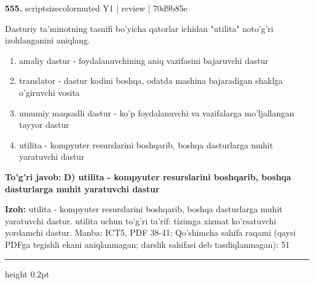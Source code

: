 \documentclass[10pt,a4paper]{article}
\begin{document}
{\bfseries\sffamily\color{ink} 555.} {scriptsizecolor{muted} Y1 | review | 70d9b85e}
\par
Dasturiy ta'minotning tasnifi bo'yicha qatorlar ichidan "utilita" noto'g'ri izohlanganini aniqlang.
\begin{enumerate}[label=\Alph*),leftmargin=9mm]
\item amaliy dastur - foydalanuvchining aniq vazifasini bajaruvchi dastur
\item translator - dastur kodini boshqa, odatda mashina bajaradigan shaklga o'giruvchi vosita
\item umumiy maqsadli dastur - ko'p foydalanuvchi va vazifalarga mo'ljallangan tayyor dastur
\item utilita - kompyuter resurslarini boshqarib, boshqa dasturlarga muhit yaratuvchi dastur
\end{enumerate}
\begin{tcolorbox}[enhanced,breakable,colback=teal!4,colframe=teal!60!black,boxrule=0.45pt,arc=1.2mm,left=2.7mm,right=2.7mm,top=1.8mm,bottom=1.8mm,before skip=2mm,after skip=2mm]
{\bfseries\sffamily\color{teal}To'g'ri javob:} \textbf{D) utilita - kompyuter resurslarini boshqarib, boshqa dasturlarga muhit yaratuvchi dastur}
\par\smallskip
{\bfseries Izoh:} utilita - kompyuter resurslarini boshqarib, boshqa dasturlarga muhit yaratuvchi dastur. utilita uchun to'g'ri ta'rif: tizimga xizmat ko'rsatuvchi yordamchi dastur. Manba: ICT5, PDF 38-41; Qo'shimcha sahifa raqami (qaysi PDFga tegishli ekani aniqlanmagan; darslik sahifasi deb tasdiqlanmagan): 51
\end{tcolorbox}
\vspace{2mm}\hrule height 0.2pt\vspace{3mm}
\end{document}
